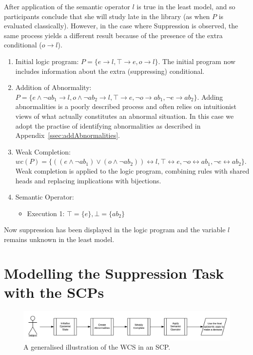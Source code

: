 \documentclass{article}
\begin{document}
After application of the semantic operator $l$ is true in the least model, and so participants conclude that she will study late in the library (as when $P$ is evaluated classically). However, in the case where Suppression is observed, the same process yields a different result because of the presence of the extra conditional ($o\rightarrow l$).
\begin{enumerate}
\item Initial logic program: $P = \{e \rightarrow l, \top \rightarrow e, o \rightarrow l \}$. The initial program now includes information about the extra (suppressing) conditional.
\item Addition of Abnormality: $P = \{e \land \lnot ab_1 \rightarrow l, o \land \lnot ab_2 \rightarrow l, \top \rightarrow e, \lnot o \rightarrow ab_1, \lnot e \rightarrow ab_2 \}$. Adding abnormalities is a poorly described process and often relies on intuitionist views of what actually constitutes an abnormal situation. In this case we adopt the practise of identifying abnormalities as described in Appendix~\ref{ssec:addAbnormalities}.
\item Weak Completion: $wc(P) = \{((e \land \lnot ab_1) \lor (o \land \lnot ab_2)) \leftrightarrow l, \top \leftrightarrow e, \lnot o \leftrightarrow ab_1, \lnot e \leftrightarrow ab_2 \}$. Weak completion is applied to the logic program, combining rules with shared heads and replacing implications with bijections.
\item Semantic Operator:
\begin{itemize}
\item Execution 1: $\top=\{e\}, \bot=\{ab_2\}$
\end{itemize}
\end{enumerate}

Now suppression has been displayed in the logic program and the variable $l$ remains unknown in the least model.

\section{Modelling the Suppression Task with the SCPs}
\begin{figure}
\begin{center}
 \centering \includegraphics[scale=0.65]{suppressionSCP_overview}
\caption{A generalised illustration of the WCS in an SCP. }
\label {fig:supoverview}
\end{center}
\end{figure}
\end{document}
